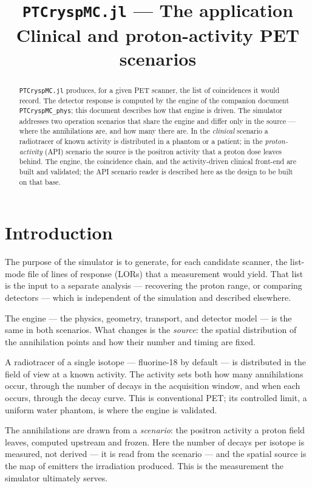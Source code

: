 \documentclass[11pt]{article}
\title{\texttt{PTCryspMC.jl} --- The application\\[2pt]
\large Clinical and proton-activity PET scenarios}
\author{}
\date{}
\begin{document}
\maketitle
\begin{abstract}
\noindent
\texttt{PTCryspMC.jl} produces, for a given PET scanner, the list of coincidences it would record.
The detector response is computed by the engine of the companion document \texttt{PTCryspMC\_phys};
this document describes how that engine is driven. The simulator addresses two operation scenarios
that share the engine and differ only in the source --- where the annihilations are, and how many
there are. In the \emph{clinical} scenario a radiotracer of known activity is distributed in a
phantom or a patient; in the \emph{proton-activity} (API) scenario the source is the
positron activity that a proton dose leaves behind. The engine, the coincidence chain, and the
activity-driven clinical front-end are built and validated; the API scenario reader is described
here as the design to be built on that base.
\end{abstract}

\tableofcontents

\section{Introduction}

The purpose of the simulator is to generate, for each candidate scanner, the list-mode file of lines
of response (LORs) that a measurement would yield. That list is the input to a separate analysis ---
recovering the proton range, or comparing detectors --- which is independent of the simulation and
described elsewhere.

The engine --- the physics, geometry, transport, and detector model --- is the same in both
scenarios. What changes is the \emph{source}: the spatial distribution of the annihilation points and
how their number and timing are fixed.

\begin{description}[style=nextline,leftmargin=1.5em]
\item[Clinical scenario.] A radiotracer of a single isotope --- fluorine-18 by default --- is
distributed in the field of view at a known activity. The activity sets both how many annihilations
occur, through the number of decays in the acquisition window, and when each occurs, through the
decay curve. This is conventional PET; its controlled limit, a uniform water phantom, is where the
engine is validated.
\item[After-proton-irradiation (API) scenario.] The annihilations are drawn from a \emph{scenario}:
the positron activity a proton field leaves, computed upstream and frozen. Here the number of decays
per isotope is measured, not derived --- it is read from the scenario --- and the spatial source is
the map of emitters the irradiation produced. This is the measurement the simulator ultimately
serves.
\end{description}
\end{document}
